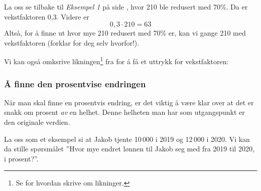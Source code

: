 La oss se tilbake til \textsl{Eksempel 1} på side \pageref{vekstfakteks}, hvor 210 ble redusert med 70\%. Da er vekstfaktoren 0,3. Videre er
\[ 0,3\cdot210=63 \]
Altså, for å finne ut hvor mye 210 redusert med 70\% er, kan vi gange 210 med vekstfaktoren (forklar for deg selv hvorfor!). \regv


\newpage
{} \vsk
Vi kan også omksrive likningen\footnote{Se  for hvordan skrive om likninger.} fra  for å få et uttrykk for vekstfaktoren: \regv

\subsubsection{Å finne den prosentvise endringen}
Når man skal finne en prosentvis endring, er det viktig å være klar over at det er snakk om prosent \textsl{av} en helhet. Denne helheten man har som utgangspunkt er den originale verdien. \vsk

La oss som et eksempel si at Jakob tjente 10\,000 i 2019 og 12\,000 i 2020. Vi kan da stille spørsmålet ''Hvor mye endret lønnen til Jakob seg med fra 2019 til 2020, i prosent?''. \vsk

